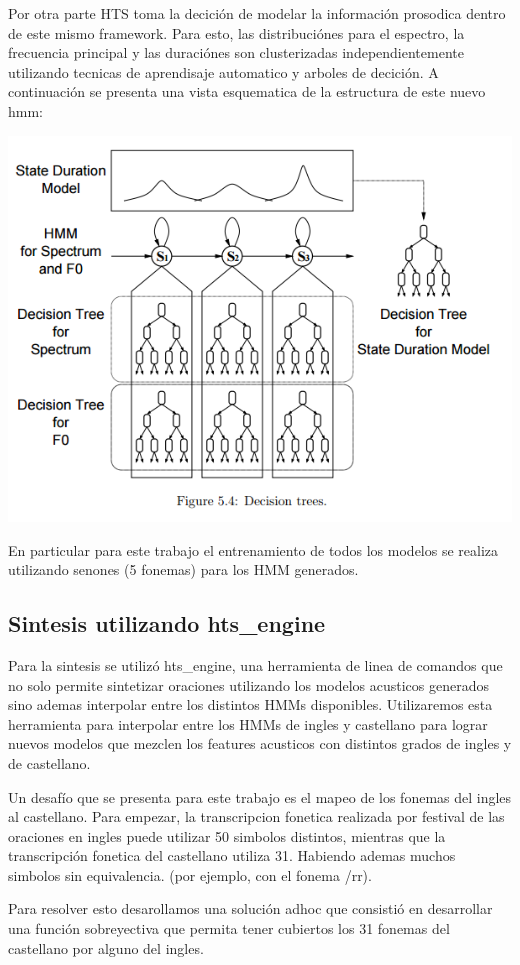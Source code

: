 Por otra parte HTS toma la decición de modelar la información prosodica dentro de este mismo framework. Para esto, las distribuciónes para el espectro, la frecuencia principal y las duraciónes son clusterizadas independientemente utilizando tecnicas de aprendisaje automatico y arboles de decición. A continuación se presenta una vista esquematica de la estructura de este nuevo hmm:

\includegraphics[scale=0.5]{imagenes/hmmContext.png}


En particular para este trabajo el entrenamiento de todos los modelos se realiza utilizando senones (5 fonemas) para los HMM generados.


\subsection{Sintesis utilizando hts\_engine}


Para la sintesis se utilizó hts\_engine, una herramienta de linea de comandos que no solo permite sintetizar oraciones utilizando los modelos acusticos generados sino ademas interpolar entre los distintos HMMs disponibles. Utilizaremos esta herramienta para interpolar entre los HMMs de ingles y castellano para lograr nuevos modelos que mezclen los features acusticos con distintos grados de ingles y de castellano.

Un desafío que se presenta para este trabajo es el mapeo de los fonemas del ingles al castellano. Para empezar, la transcripcion fonetica realizada por festival de las oraciones en ingles puede utilizar 50 simbolos distintos, mientras que la transcripción fonetica del castellano utiliza 31. Habiendo ademas muchos simbolos sin equivalencia. (por ejemplo, con el fonema /rr).

Para resolver esto desarollamos una solución adhoc que consistió en desarrollar una función sobreyectiva que permita tener cubiertos los 31 fonemas del castellano por alguno del ingles.

